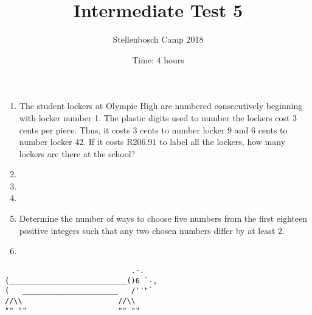 \documentclass{article}
\title{Intermediate Test 5}
\author{Stellenbosch Camp 2018}
\date{Time: $4$ hours}
\begin{document}
 \maketitle

\begin{enumerate}[1.]

\item %
The student lockers at Olympic High are numbered consecutively beginning with locker number 1. The plastic digits used to number the lockers cost $3$ cents per piece. Thus, it costs $3$ cents to number locker $9$ and $6$ cents to number locker $42$. If it costs R206.91 to label all the lockers, how many lockers are there at the school?


\vspace{6pt}
\item %


\vspace{6pt}
\item %


\vspace{6pt}
\item %


\vspace{6pt}
\item %
Determine the number of ways to choose five numbers from the first eighteen positive integers such that any two chosen numbers differ by at least $2$.


\vspace{6pt}
\item %


\end{enumerate}


\vfill
\centering
\begin{BVerbatim}
                             .-.
(___________________________()6 `-,
(   ______________________   /''"`
//\\                      //\\
"" ""                     "" ""
\end{BVerbatim}
\end{document}
